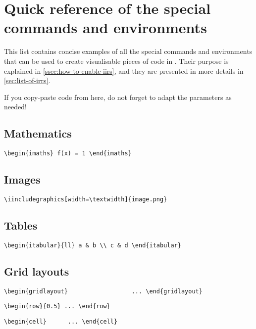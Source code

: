 \section*{Quick reference of the special commands and environments}
\label{sec:quick-reference}

This list contains concise examples of all the special commands and environments that can be used to create visualisable pieces of code in \iLaTeX{}.
Their purpose is explained in \autoref{ssec:how-to-enable-iirs}, and they are presented in more details in \autoref{sec:list-of-irrs}.

If you copy-paste code from here, do not forget to adapt the parameters as needed!

\subsection*{Mathematics}

\hfill
\lstinline[style=custom-latex]|\begin{imaths} f(x) = 1 \end{imaths}|



\subsection*{Images}

\hfill
\lstinline[style=custom-latex]|\iincludegraphics[width=\textwidth]{image.png}|


\subsection*{Tables}

\hfill
\lstinline[style=custom-latex]|\begin{itabular}{ll} a & b \\ c & d \end{itabular}|


\subsection*{Grid layouts}

\hfill
\lstinline[style=custom-latex]|\begin{gridlayout}{\textwidth}{8cm} ... \end{gridlayout}|

\hfill
\lstinline[style=custom-latex]|\begin{row}{0.5} ... \end{row}|

\hfill
\lstinline[style=custom-latex]|\begin{cell}{0.5} ... \end{cell}|